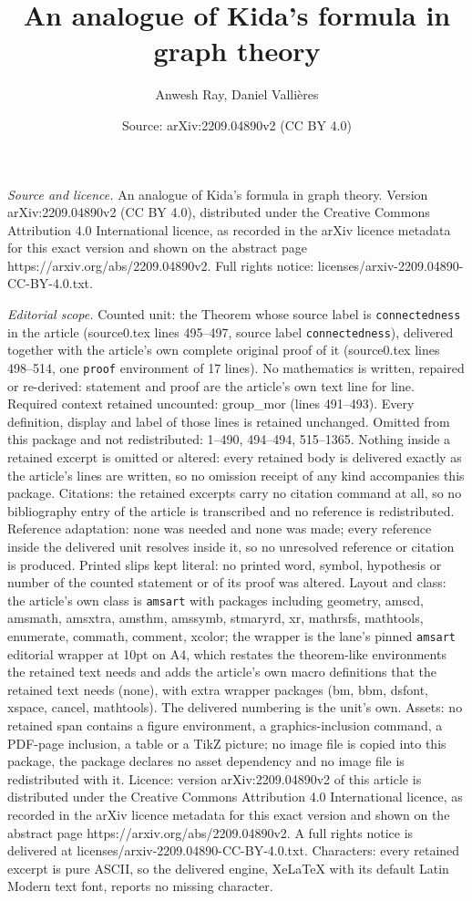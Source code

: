 \documentclass[10pt,a4paper]{amsart}
\title[An analogue of Kida's formula in graph theory]{An analogue of Kida's formula in graph theory}
\author{Anwesh Ray, Daniel Valli\`eres}
\date{Source: arXiv:2209.04890v2 (CC BY 4.0)}
\begin{document}
\maketitle

\noindent\emph{Source and licence.} An analogue of Kida's formula in graph theory. Version arXiv:2209.04890v2 (CC BY 4.0), distributed under the Creative Commons Attribution 4.0 International licence, as recorded in the arXiv licence metadata for this exact version and shown on the abstract page https://arxiv.org/abs/2209.04890v2. Full rights notice: licenses/arxiv-2209.04890-CC-BY-4.0.txt.\par\smallskip

\noindent\textit{Editorial scope.} Counted unit: the Theorem whose source label is \texttt{connectedness} in the article (source0.tex lines 495--497, source label \texttt{connectedness}), delivered together with the article's own complete original proof of it (source0.tex lines 498--514, one \texttt{proof} environment of 17 lines). No mathematics is written, repaired or re-derived: statement and proof are the article's own text line for line. Required context retained uncounted: group\_mor (lines 491--493). Every definition, display and label of those lines is retained unchanged. Omitted from this package and not redistributed: 1--490, 494--494, 515--1365. Nothing inside a retained excerpt is omitted or altered: every retained body is delivered exactly as the article's lines are written, so no omission receipt of any kind accompanies this package. Citations: the retained excerpts carry no citation command at all, so no bibliography entry of the article is transcribed and no reference is redistributed. Reference adaptation: none was needed and none was made; every reference inside the delivered unit resolves inside it, so no unresolved reference or citation is produced. Printed slips kept literal: no printed word, symbol, hypothesis or number of the counted statement or of its proof was altered. Layout and class: the article's own class is \texttt{amsart} with packages including geometry, amscd, amsmath, amsxtra, amsthm, amssymb, stmaryrd, xr, mathrsfs, mathtools, enumerate, commath, comment, xcolor; the wrapper is the lane's pinned \texttt{amsart} editorial wrapper at 10pt on A4, which restates the theorem-like environments the retained text needs and adds the article's own macro definitions that the retained text needs (none), with extra wrapper packages (bm, bbm, dsfont, xspace, cancel, mathtools). The delivered numbering is the unit's own. Assets: no retained span contains a figure environment, a graphics-inclusion command, a PDF-page inclusion, a table or a TikZ picture; no image file is copied into this package, the package declares no asset dependency and no image file is redistributed with it. Licence: version arXiv:2209.04890v2 of this article is distributed under the Creative Commons Attribution 4.0 International licence, as recorded in the arXiv licence metadata for this exact version and shown on the abstract page https://arxiv.org/abs/2209.04890v2. A full rights notice is delivered at licenses/arxiv-2209.04890-CC-BY-4.0.txt. Characters: every retained excerpt is pure ASCII, so the delivered engine, XeLaTeX with its default Latin Modern text font, reports no missing character.
\end{document}
